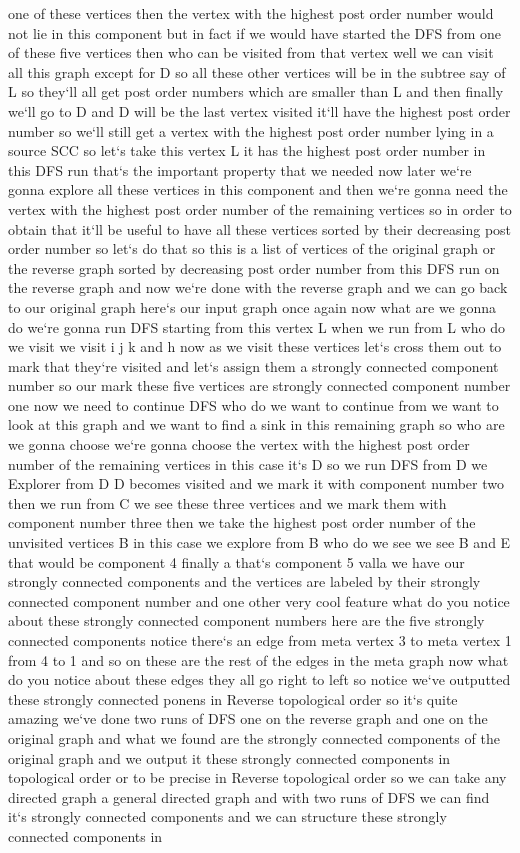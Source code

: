 one of these vertices then the vertex with the highest post order number would not lie in this component but in fact if we would have started the DFS from one of these five vertices then who can be visited from that vertex well we can visit all this graph except for D so all these other vertices will be in the subtree say of L so they`ll all get post order numbers which are smaller than L and then finally we`ll go to D and D will be the last vertex visited it`ll have the highest post order number so we`ll still get a vertex with the highest post order number lying in a source SCC so let`s take this vertex L it has the highest post order number in this DFS run that`s the important property that we needed now later we`re gonna explore all these vertices in this component and then we`re gonna need the vertex with the highest post order number of the remaining vertices so in order to obtain that it`ll be useful to have all these vertices sorted by their decreasing post order number so let`s do that so this is a list of vertices of the original graph or the reverse graph sorted by decreasing post order number from this DFS run on the reverse graph and now we`re done with the reverse graph and we can go back to our original graph here`s our input graph once again now what are we gonna do we`re gonna run DFS starting from this vertex L when we run from L who do we visit we visit i j k and h now as we visit these vertices let`s cross them out to mark that they`re visited and let`s assign them a strongly connected component number so our mark these five vertices are strongly connected component number one now we need to continue DFS who do we want to continue from we want to look at this graph and we want to find a sink in this remaining graph so who are we gonna choose we`re gonna choose the vertex with the highest post order number of the remaining vertices in this case it`s D so we run DFS from D we Explorer from D D becomes visited and we mark it with component number two then we run from C we see these three vertices and we mark them with component number three then we take the highest post order number of the unvisited vertices B in this case we explore from B who do we see we see B and E that would be component 4 finally a that`s component 5 valla we have our strongly connected components and the vertices are labeled by their strongly connected component number and one other very cool feature what do you notice about these strongly connected component numbers here are the five strongly connected components notice there`s an edge from meta vertex 3 to meta vertex 1 from 4 to 1 and so on these are the rest of the edges in the meta graph now what do you notice about these edges they all go right to left so notice we`ve outputted these strongly connected ponens in Reverse topological order so it`s quite amazing we`ve done two runs of DFS one on the reverse graph and one on the original graph and what we found are the strongly connected components of the original graph and we output it these strongly connected components in topological order or to be precise in Reverse topological order so we can take any directed graph a general directed graph and with two runs of DFS we can find it`s strongly connected components and we can structure these strongly connected components in 